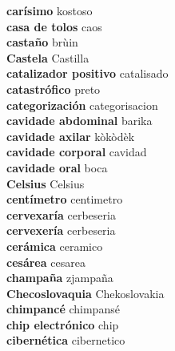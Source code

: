 \textbf{ carísimo  } kostoso \\
\textbf{ casa de tolos  } caos \\
\textbf{ castaño  } brùin \\
\textbf{ Castela  } Castilla \\
\textbf{ catalizador positivo  } catalisado \\
\textbf{ catastrófico  } preto \\
\textbf{ categorización  } categorisacion \\
\textbf{ cavidade abdominal  } barika \\
\textbf{ cavidade axilar  } kòkòdèk \\
\textbf{ cavidade corporal  } cavidad \\
\textbf{ cavidade oral  } boca \\
\textbf{ Celsius  } Celsius \\
\textbf{ centímetro  } centimetro \\
\textbf{ cervexaría  } cerbeseria \\
\textbf{ cervexería  } cerbeseria \\
\textbf{ cerámica  } ceramico \\
\textbf{ cesárea  } cesarea \\
\textbf{ champaña  } zjampaña \\
\textbf{ Checoslovaquia  } Chekoslovakia \\
\textbf{ chimpancé  } chimpansé \\
\textbf{ chip electrónico  } chip \\
\textbf{ cibernética  } cibernetico \\
